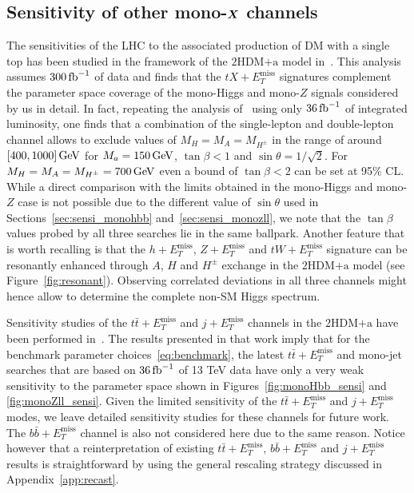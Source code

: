 \documentclass[a4paper, 11pt,notoc]{article}
\newcommand{\MET}{\ensuremath{E_T^\mathrm{miss}}\xspace}
\newcommand{\ma}{\ensuremath{M_{a}}\xspace}
\newcommand{\mHc}{\ensuremath{M_{H^{\pm}}}\xspace}
\newcommand{\hdma}{\ensuremath{\textrm{2HDM+a}}\xspace}
\def\bm#1{\mbox{\boldmath$#1$\unboldmath}}
\begin{document}
\subsection[Sensitivity of other mono-$X$ channels]{Sensitivity of other mono-$\bm{X}$ channels}
\label{sec:sensi_others}

The sensitivities of the LHC to the associated production of DM with a single top has been  studied in the framework of the \hdma model in~\cite{Pani:2017qyd}. This analysis assumes $300 \, {\rm fb}^{-1}$ of data and finds that the $t X + \MET$ signatures complement the parameter space coverage of the mono-Higgs and  mono-$Z$ signals considered by us in detail.   In fact, repeating  the analysis of~\cite{Pani:2017qyd} using only   $36 \, {\rm fb}^{-1}$ of integrated luminosity, one finds that a combination of the single-lepton and double-lepton channel allows to exclude values of $M_H = M_A = \mHc$ in the range of around $[400, 1000 ] \, {\rm GeV}$ for $\ma = 150 \, {\rm GeV}$, $\tan \beta < 1$ and $\sin \theta = 1/\sqrt{2}$. For $M_H = M_A = \mHc = 700 \, {\rm GeV}$ even a bound of $\tan \beta < 2$ can be set at 95\% CL. While a direct comparison with the limits obtained in the mono-Higgs and mono-$Z$ case is not possible due to the different value of $\sin \theta$ used in Sections~\ref{sec:sensi_monohbb} and~\ref{sec:sensi_monozll},  we note that the $\tan \beta$ values probed by all three searches  lie in the same ballpark. Another feature that is worth recalling is that the $h+\MET$, $Z+\MET$ and $tW+\MET$ signature can be resonantly enhanced through $A$, $H$ and $H^\pm$ exchange in the \hdma model (see Figure~\ref{fig:resonant}). Observing correlated deviations in all three channels might hence allow to determine the complete non-SM Higgs spectrum. 

Sensitivity studies of the $t \bar t + \MET$ and $j + \MET$ channels in the \hdma have been performed in~\cite{Bauer:2017ota}. The results presented in that work imply that for the benchmark parameter choices~\eqref{eq:benchmark}, the latest  $t \bar t + \MET$ and  mono-jet searches that are based on $36 \, {\rm fb}^{-1}$ of 13 TeV data have  only a very weak sensitivity to the parameter space shown in Figures~\ref{fig:monoHbb_sensi} and \ref{fig:monoZll_sensi}. Given the limited sensitivity of the $t \bar t + \MET$ and $j + \MET$  modes, we leave detailed sensitivity studies for
   these channels for future work. The $b \bar b + \MET$ channel is also not considered here due to the same reason. Notice however that a {\color{green} reinterpretation} of existing $t \bar t + \MET$, $b \bar b + \MET$ and $j + \MET$ results is straightforward by using the general rescaling strategy discussed in Appendix~\ref{app:recast}. 
\end{document}

